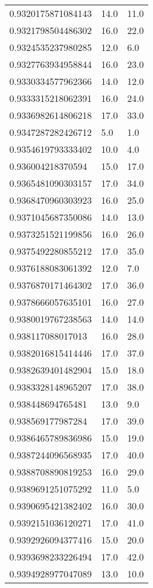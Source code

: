\begin{center}
\begin{supertabular}[H]{p{0.30\textwidth}p{0.05\textwidth}p{0.05\textwidth}}
0.9320175871084143 & 14.0 & 11.0 \\ 
0.9321798504486302 & 16.0 & 22.0 \\ 
0.9324535237980285 & 12.0 & 6.0 \\ 
0.9327763934958844 & 16.0 & 23.0 \\ 
0.9330334577962366 & 14.0 & 12.0 \\ 
0.9333315218062391 & 16.0 & 24.0 \\ 
0.9336982614806218 & 17.0 & 33.0 \\ 
0.9347287282426712 & 5.0 & 1.0 \\ 
0.9354619793333402 & 10.0 & 4.0 \\ 
0.936004218370594 & 15.0 & 17.0 \\ 
0.9365481090303157 & 17.0 & 34.0 \\ 
0.9368470960303923 & 16.0 & 25.0 \\ 
0.9371045687350086 & 14.0 & 13.0 \\ 
0.9373251521199856 & 16.0 & 26.0 \\ 
0.9375492280855212 & 17.0 & 35.0 \\ 
0.9376188083061392 & 12.0 & 7.0 \\ 
0.9376870171464302 & 17.0 & 36.0 \\ 
0.9378666057635101 & 16.0 & 27.0 \\ 
0.9380019767238563 & 14.0 & 14.0 \\ 
0.938117088017013 & 16.0 & 28.0 \\ 
0.9382016815414446 & 17.0 & 37.0 \\ 
0.9382639401482904 & 15.0 & 18.0 \\ 
0.9383328148965207 & 17.0 & 38.0 \\ 
0.938448694765481 & 13.0 & 9.0 \\ 
0.938569177987284 & 17.0 & 39.0 \\ 
0.9386465789836986 & 15.0 & 19.0 \\ 
0.9387244096568935 & 17.0 & 40.0 \\ 
0.9388708890819253 & 16.0 & 29.0 \\ 
0.9389691251075292 & 11.0 & 5.0 \\ 
0.9390695421382402 & 16.0 & 30.0 \\ 
0.9392151036120271 & 17.0 & 41.0 \\ 
0.9392926094377416 & 15.0 & 20.0 \\ 
0.9393698233226494 & 17.0 & 42.0 \\ 
0.9394928977047089 & 13.0 & 10.0 \\ 

\end{supertabular}
\end{center}
